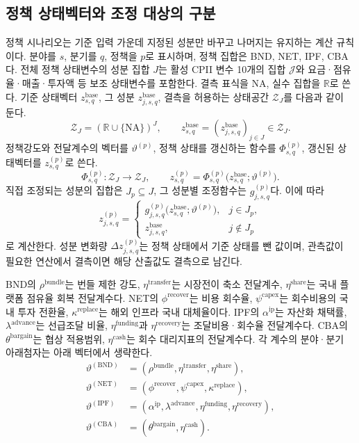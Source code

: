 \documentclass[11pt,a4paper]{report}
\begin{document}
\subsection{정책 상태벡터와 조정 대상의 구분}
정책 시나리오는 기준 입력 가운데 지정된 성분만 바꾸고 나머지는 유지하는 계산 규칙이다. 분야를 \(s\), 분기를 \(q\), 정책을 \(p\)로 표시하며, 정책 집합은 BND, NET, IPF, CBA다. 전체 정책 상태변수의 성분 집합 \(J\)는 활성 CPII 변수 10개의 집합 \(\mathcal J\)와 요금·점유율·매출·투자액 등 보조 상태변수를 포함한다. 결측 표식을 \(\mathrm{NA}\), 실수 집합을 \(\mathbb R\)로 쓴다. 기준 상태벡터 \(z^{\mathrm{base}}_{s,q}\), 그 성분 \(z^{\mathrm{base}}_{j,s,q}\), 결측을 허용하는 상태공간 \(\mathcal Z_J\)를 다음과 같이 둔다.
\[
\mathcal Z_J=(\mathbb R\cup\{\mathrm{NA}\})^J,
\qquad z^{\mathrm{base}}_{s,q}=(z^{\mathrm{base}}_{j,s,q})_{j\in J}\in\mathcal Z_J.
\]
정책강도와 전달계수의 벡터를 \(\vartheta^{(p)}\), 정책 상태를 갱신하는 함수를 \(\Phi^{(p)}_{s,q}\), 갱신된 상태벡터를 \(z^{(p)}_{s,q}\)로 쓴다.
\[
\Phi^{(p)}_{s,q}:\mathcal Z_J\to\mathcal Z_J,
\qquad z^{(p)}_{s,q}=\Phi^{(p)}_{s,q}
\bigl(z^{\mathrm{base}}_{s,q};\vartheta^{(p)}\bigr).
\]
직접 조정되는 성분의 집합은 \(J_p\subseteq J\), 그 성분별 조정함수는 \(g^{(p)}_{j,s,q}\)다. 이에 따라
\[
z^{(p)}_{j,s,q}=\begin{cases}
g^{(p)}_{j,s,q}\bigl(z^{\mathrm{base}}_{s,q};\vartheta^{(p)}\bigr),&j\in J_p,\\
z^{\mathrm{base}}_{j,s,q},&j\notin J_p
\end{cases}
\]
로 계산한다. 성분 변화량 \(\Delta z^{(p)}_{j,s,q}\)는 정책 상태에서 기준 상태를 뺀 값이며, 관측값이 필요한 연산에서 결측이면 해당 산출값도 결측으로 남긴다.

BND의 \(\rho^{\mathrm{bundle}}\)는 번들 제한 강도, \(\eta^{\mathrm{transfer}}\)는 시장전이 축소 전달계수, \(\eta^{\mathrm{share}}\)는 국내 플랫폼 점유율 회복 전달계수다. NET의 \(\phi^{\mathrm{recover}}\)는 비용 회수율, \(\psi^{\mathrm{capex}}\)는 회수비용의 국내 투자 전환율, \(\kappa^{\mathrm{replace}}\)는 해외 인프라 국내 대체율이다. IPF의 \(\alpha^{\mathrm{ip}}\)는 자산화 채택률, \(\lambda^{\mathrm{advance}}\)는 선급조달 비율, \(\eta^{\mathrm{funding}}\)과 \(\eta^{\mathrm{recovery}}\)는 조달비용·회수율 전달계수다. CBA의 \(\theta^{\mathrm{bargain}}\)는 협상 적용범위, \(\eta^{\mathrm{cash}}\)는 회수 대리지표의 전달계수다. 각 계수의 분야·분기 아래첨자는 아래 벡터에서 생략한다.
\[
\begin{aligned}
\vartheta^{(\mathrm{BND})}&=(\rho^{\mathrm{bundle}},\eta^{\mathrm{transfer}},\eta^{\mathrm{share}}),\\
\vartheta^{(\mathrm{NET})}&=(\phi^{\mathrm{recover}},\psi^{\mathrm{capex}},\kappa^{\mathrm{replace}}),\\
\vartheta^{(\mathrm{IPF})}&=(\alpha^{\mathrm{ip}},\lambda^{\mathrm{advance}},\eta^{\mathrm{funding}},\eta^{\mathrm{recovery}}),\\
\vartheta^{(\mathrm{CBA})}&=(\theta^{\mathrm{bargain}},\eta^{\mathrm{cash}}).
\end{aligned}
\]
\end{document}
